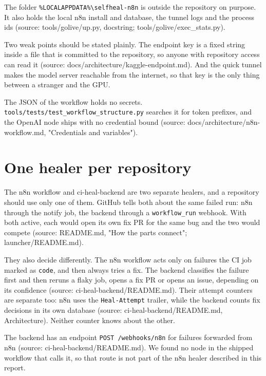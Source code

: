 \documentclass[11pt,a4paper]{report}
\begin{document}
The folder \texttt{\%LOCALAPPDATA\%\textbackslash{}selfheal-\allowbreak{}n8n} is outside the repository on purpose. It also holds the local n8n install and database, the tunnel logs and the process ids (source: tools/golive/up.py, docstring; tools/golive/exec\_stats.py).

Two weak points should be stated plainly. The endpoint key is a fixed string inside a file that is committed to the repository, so anyone with repository access can read it (source: docs/architecture/kaggle-endpoint.md). And the quick tunnel makes the model server reachable from the internet, so that key is the only thing between a stranger and the GPU.

The JSON of the workflow holds no secrets. \texttt{tools/\allowbreak{}tests/\allowbreak{}test\_\allowbreak{}workflow\_\allowbreak{}structure.\allowbreak{}py} searches it for token prefixes, and the OpenAI node ships with no credential bound (source: docs/architecture/n8n-workflow.md, "Credentials and variables").

\section{One healer per repository}

The n8n workflow and ci-heal-backend are two separate healers, and a repository should use only one of them. GitHub tells both about the same failed run: n8n through the notify job, the backend through a \texttt{workflow\_\allowbreak{}run} webhook. With both active, each would open its own fix PR for the same bug and the two would compete (source: README.md, "How the parts connect"; launcher/README.md).

They also decide differently. The n8n workflow acts only on failures the CI job marked as \texttt{code}, and then always tries a fix. The backend classifies the failure first and then reruns a flaky job, opens a fix PR or opens an issue, depending on its confidence (source: ci-heal-backend/README.md). Their attempt counters are separate too: n8n uses the \texttt{Heal-\allowbreak{}Attempt} trailer, while the backend counts fix decisions in its own database (source: ci-heal-backend/README.md, Architecture). Neither counter knows about the other.

The backend has an endpoint \texttt{POST /\allowbreak{}webhooks/\allowbreak{}n8n} for failures forwarded from n8n (source: ci-heal-backend/README.md). We found no node in the shipped workflow that calls it, so that route is not part of the n8n healer described in this report.
\end{document}
